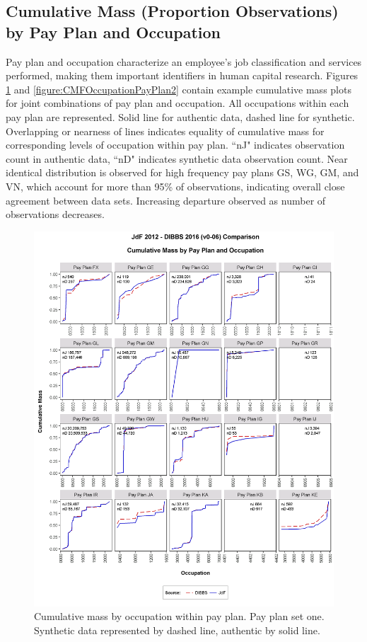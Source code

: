 \documentclass[10pt, letterpaper]{article}
\begin{document}
\begin{spacing}{1.0}
\clearpage

\section{Cumulative Mass (Proportion Observations) by Pay Plan and Occupation}

Pay plan and occupation characterize an employee's job classification and services performed, making them important identifiers in human capital research.  Figures \ref{figure:CMFOccupationPayPlan1} and \ref{figure:CMFOccupationPayPlan2} contain example cumulative mass plots for joint combinations of pay plan and occupation.  All occupations within each pay plan are represented.  Solid line for authentic data, dashed line for synthetic.  Overlapping or nearness of lines indicates equality of cumulative mass for corresponding levels of occupation within pay plan.  ``nJ" indicates observation count in authentic data, ``nD" indicates synthetic data observation count.  Near identical distribution is observed for high frequency pay plans GS, WG, GM, and VN, which account for more than 95\% of observations, indicating overall close agreement between data sets.  Increasing departure observed as number of observations decreases.\\

\begin{figure}[h]
    \centering
    \includegraphics[width=6.25in, trim={0 1in 0 0.75in}, clip]{CMFOccupationPayPlan61.png}
    \caption{Cumulative mass by occupation within pay plan.  Pay plan set one.  Synthetic data represented by dashed line, authentic by solid line.}
    \label{figure:CMFOccupationPayPlan1}
\end{figure}


\end{spacing}
\end{document}
